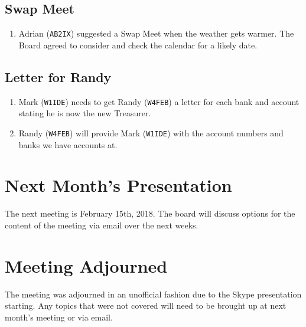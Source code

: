 \documentclass[10pt,letterpaper]{article}
\begin{document}
\subsection{Swap Meet}
\begin{enumerate}
  \item Adrian (\texttt{AB2IX}) suggested a Swap Meet when the weather gets warmer. The Board agreed to consider and check the calendar for a likely date.
\end{enumerate}

\subsection{Letter for Randy}
\begin{enumerate}
  \item Mark (\texttt{W1IDE}) needs to get Randy (\texttt{W4FEB}) a letter for each bank and account stating he is now the new Treasurer.
  \item Randy (\texttt{W4FEB}) will provide Mark (\texttt{W1IDE}) with the account numbers and banks we have accounts at.
\end{enumerate}

\section{Next Month's Presentation}
The next meeting is February 15th, 2018. The board will discuss options for the content of the meeting via email over the next weeks.

\section{Meeting Adjourned}
The meeting was adjourned in an unofficial fashion due to the Skype presentation starting. Any topics that were not covered will need to be brought up at next month's meeting or via email.
\end{document}
